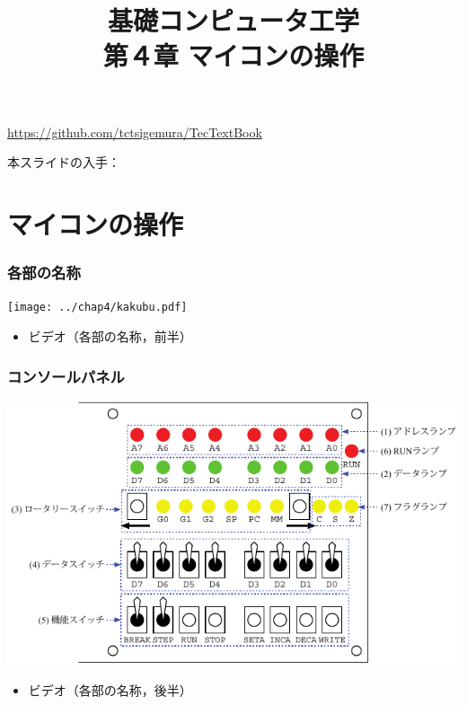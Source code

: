 \documentclass[handout]{beamer}         %
\begin{document}
\title{基礎コンピュータ工学\\第４章 マイコンの操作}
\date{}

\begin{frame}
  \titlepage
  \centerline{\url{https://github.com/tctsigemura/TecTextBook}}
  \vfill
  \centerline{本スライドの入手：
    }
\end{frame}


\section{マイコンの操作}
\begin{frame}
  \frametitle{各部の名称}
  \vfill
  \centerline{\texttt{[image: ../chap4/kakubu.pdf]}}
  \vfill
  \begin{itemize}
    \item ビデオ（各部の名称，前半）
  \end{itemize}
  \vfill
\end{frame}

\begin{frame}
  \frametitle{コンソールパネル}
  \vfill
  \centerline{\includegraphics[scale=1.0]{../chap4/console.pdf}}
  \vfill
  \begin{itemize}
    \item ビデオ（各部の名称，後半）
  \end{itemize}
  \vfill
\end{frame}
\end{document}
